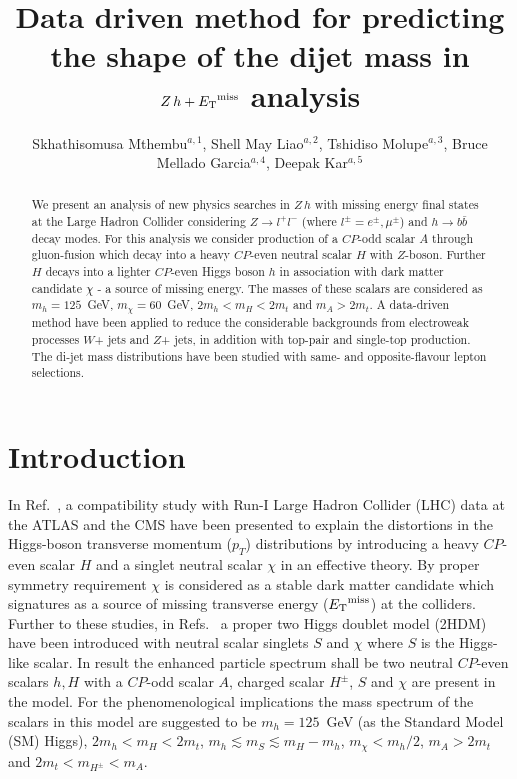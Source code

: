 \documentclass[a4paper]{jpconf}
\begin{document}

\title{Data driven method for predicting the shape of the dijet mass in $Z\,h + {E_{\rm T}}^{\rm {miss}}$ analysis}

\author{Skhathisomusa Mthembu$^{a,1}$, Shell May Liao$^{a,2}$, Tshidiso Molupe$^{a,3}$, Bruce Mellado Garcia$^{a,4}$, Deepak Kar$^{a,5}$}
\address{$^{a}$ School of Physics, University of the Witwatersrand, Johannesburg, Wits 2050, South Africa.}  

\begin{abstract}
We present an analysis of new physics searches in $Z\,h$ with missing energy final states at the Large Hadron Collider considering
$Z \to l^+ l^-$ (where $l^\pm = e^\pm, \mu^\pm$) and $h \to b\bar b$ decay modes. 
For this analysis we consider production of a $CP$-odd scalar $A$ through gluon-fusion which decay into a heavy $CP$-even 
neutral scalar $H$ with $Z$-boson. 
Further $H$ decays into a lighter $CP$-even Higgs boson $h$ in association with dark matter candidate $\chi$ - a
source of missing energy. The masses of these scalars are considered as $m_h = 125$~GeV, $m_\chi = 60$~GeV, 
$2 m_h < m_H < 2 m_t$ and $m_A > 2 m_t$. A data-driven method have been applied to reduce the considerable backgrounds from
electroweak processes $W$+ jets and $Z$+ jets, in addition with top-pair and single-top production. The di-jet mass distributions have
been studied with same- and opposite-flavour lepton selections.  
\end{abstract}



\section{Introduction}
\label{intro}
In Ref.~\cite{vonBuddenbrock:2015ema}, a compatibility study with Run-I Large Hadron Collider (LHC) data at the ATLAS and the
CMS have been presented to explain the distortions in the Higgs-boson transverse momentum ($p_T$) distributions by introducing a
heavy $CP$-even scalar $H$ and a singlet neutral scalar $\chi$ in an effective theory. By proper symmetry requirement $\chi$ is
considered as a stable dark matter candidate which signatures as a source of missing transverse energy (${E_{\rm T}}^{\rm {miss}}$)
at the colliders. 
Further to these studies, in Refs.~\cite{Kumar:2016vut, vonBuddenbrock:2016psa} a proper two Higgs doublet model (2HDM)
have been introduced with neutral scalar singlets $S$ and $\chi$ where $S$ is the Higgs-like scalar. In result the enhanced particle
spectrum shall be two neutral $CP$-even scalars $h, H$ with a $CP$-odd scalar $A$, charged scalar $H^\pm$, $S$ and $\chi$ are
present in the model.
For the phenomenological implications the mass spectrum of the scalars in this model are suggested to be $m_h = 125$~GeV (as the
Standard Model (SM) Higgs), $2 m_h < m_H < 2 m_t$, $m_h \lesssim m_S \lesssim m_H - m_h$, $m_\chi < m_h/2$, 
$m_A > 2 m_t$ and $2 m_t < m_{H^\pm} < m_A$.   
\end{document}
